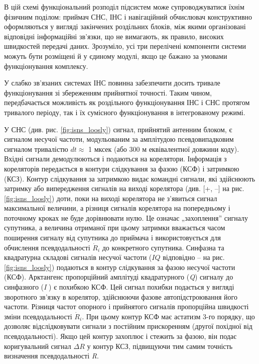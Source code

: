 В цій схемі функціональний розподіл підсистем може супроводжуватися їхнім фізичним 
поділом: приймач СНС, ІНС і навігаційний обчислювач конструктивно оформляються у 
вигляді закінчених роздільних блоків, між якими організовані відповідні інформаційні 
зв'язки, що не вимагають, як правило, високих швидкостей передачі даних. Зрозуміло, 
усі три перелічені компоненти системи можуть бути розміщені й у єдиному модулі, якщо 
це бажано за умовами функціонування комплексу.

У слабко зв'язаних системах ІНС повинна забезпечити досить тривале функціонування 
зі  збереженням прийнятної точності.  Таким  чином, передбачається можливість як 
роздільного функціонування ІНС і СНС протягом тривалого періоду, так і їх сумісного 
функціонування в інтегрованому режимі. 

У СНС  (див. рис. \ref{fig:isns_loosly}) сигнал, прийнятий антенним блоком, є сигналом несучої частоти,  
модульованим за амплітудою псевдовипадковим сигналом тривалістю  $dt \approx$ 1 мксек 
(або 300 м еквівалентної довжини коду). Вхідні сигнали демодулюються і подаються 
на корелятори.  Інформація з кореляторів передається в контури слідкування за фазою 
(КСФ) і затримкою (КСЗ). Контур слідкування за затримкою видає командні сигнали, 
які здійснюють  затримку або випередження сигналів на виході корелятора (див. [+, --] 
на рис. \ref{fig:isns_loosly}) доти, поки на виході корелятора не з'явиться сигнал максимальної величини, 
а різниця сигналів корелятора на попередньому і поточному кроках не буде дорівнювати 
нулю. Це означає „захоплення'' сигналу супутника, а величина отриманої при цьому 
затримки  вважається часом поширення сигналу від супутника до приймача і використовується 
для обчислення псевдодальності $\dot{R}_{i}$ до конкретного супутника. Синфазна та 
квадратурна складові сигналів несучої частоти ($IQ$ відповідно -- на рис. \ref{fig:isns_loosly}) 
подаються в контур слідкування за фазою несучої частоти (КСФ). Арктангенс 
пропорційний амплітуді квадратурного (\textit{Q}) сигналу до синфазного (\textit{I} ) 
є похибкою КСФ. Цей сигнал похибки подається у вигляді зворотного зв'язку в корелятор, 
здійснюючи фазове автопідстроювання його частоти. Різниця частот опорного і прийнятого 
сигналів пропорційна швидкості зміни псевдодальності  $\dot{R}_{i} $. При цьому
контур КСФ має астатизм 3-го порядку, що дозволяє відслідковувати 
сигнали з постійним прискоренням (другої похідної від псевдодальності). Якщо цей 
контур захоплює і стежить за фазою, він подає коригувальний сигнал $\Delta R$ у 
контур КСЗ, підвищуючи тим самим точність визначення псевдодальності \textit{R}. 

